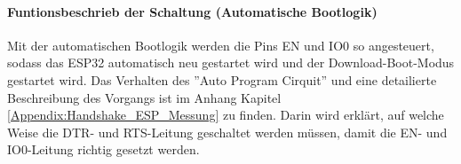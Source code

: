 \paragraph{Funtionsbeschrieb der Schaltung (Automatische Bootlogik)}\mbox{}

Mit der automatischen Bootlogik werden die Pins EN und IO0 so angesteuert, sodass das ESP32 automatisch neu gestartet wird und der Download-Boot-Modus gestartet wird. Das Verhalten des ''Auto Program Cirquit'' und eine detailierte Beschreibung des Vorgangs ist im Anhang Kapitel \ref{Appendix:Handshake_ESP_Messung} zu finden. Darin wird erklärt, auf welche Weise die DTR- und RTS-Leitung geschaltet werden müssen, damit die EN- und IO0-Leitung richtig gesetzt werden.